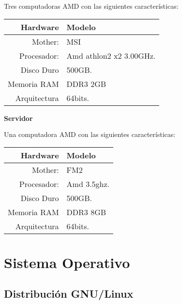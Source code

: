 			\vspace{0.3cm}
		
			Tres computadoras AMD con las siguientes características:\par\vspace{0.2cm}
					
			\begin{center}			
				\begin{tabular}{| r | l |}
					\hline
					Hardware & Modelo \\ \hline
					Mother: & MSI \\ 
					Procesador: & Amd athlon2 x2 3.00GHz. \\
					Disco Duro & 500GB. \\
					Memoria RAM & DDR3 2GB \\
					Arquitectura & 64bits.\\ \hline
				\end{tabular}
			\end{center}
			
			\vspace{0.3cm}
		
			\textbf{Servidor}	
		
			Una computadora AMD con las siguientes características:
		
			\begin{center}			
				\begin{tabular}{| r | l |}
					\hline
					Hardware & Modelo \\ \hline
					Mother: & FM2 \\ 
					Procesador: & Amd 3.5ghz. \\
					Disco Duro & 500GB. \\
					Memoria RAM & DDR3 8GB \\
					Arquitectura & 64bits.\\ \hline
				\end{tabular}
			\end{center} 
					
		\vspace{0.3cm}
		
	
	\section{Sistema Operativo}
		
		\subsection{Distribución GNU/Linux}
			
